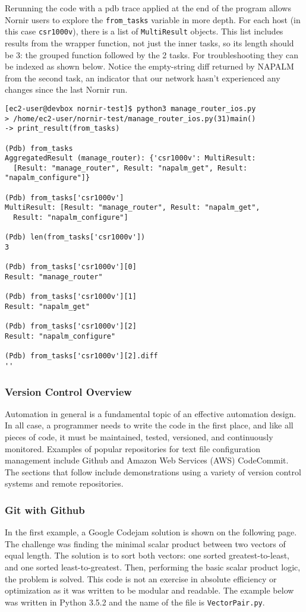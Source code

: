 Rerunning the code with a pdb trace applied at the end of the program allows
Nornir users to explore the \verb|from_tasks| variable in more depth. For each
host (in this case \verb|csr1000v|), there is a list of \verb|MultiResult| objects.
This list includes results from the wrapper function, not just the inner tasks, so
its length should be 3: the grouped function followed by the 2 tasks. For
troubleshooting they can be indexed as shown below. Notice the empty-string
diff returned by NAPALM from the second task, an indicator that our network
hasn't experienced any changes since the last Nornir run.

\begin{verbatim}
[ec2-user@devbox nornir-test]$ python3 manage_router_ios.py
> /home/ec2-user/nornir-test/manage_router_ios.py(31)main()
-> print_result(from_tasks)

(Pdb) from_tasks
AggregatedResult (manage_router): {'csr1000v': MultiResult:
  [Result: "manage_router", Result: "napalm_get", Result: "napalm_configure"]}

(Pdb) from_tasks['csr1000v']
MultiResult: [Result: "manage_router", Result: "napalm_get",
  Result: "napalm_configure"]

(Pdb) len(from_tasks['csr1000v'])
3

(Pdb) from_tasks['csr1000v'][0]
Result: "manage_router"

(Pdb) from_tasks['csr1000v'][1]
Result: "napalm_get"

(Pdb) from_tasks['csr1000v'][2]
Result: "napalm_configure"

(Pdb) from_tasks['csr1000v'][2].diff
''
\end{verbatim}

\subsubsection{Version Control Overview}
Automation in general is a fundamental topic of an effective automation
design. In all case, a programmer needs to write the code in the first
place, and like all pieces of code, it must be maintained, tested, versioned,
and continuously monitored. Examples of popular repositories for text file
configuration management include Github and Amazon Web Services (AWS) CodeCommit.
The sections that follow include demonstrations using a variety of version
control systems and remote repositories.

\subsubsection{Git with Github}
In the first example, a Google Codejam solution is shown on the following
page. The challenge was finding the minimal scalar product between two vectors
of equal length. The solution is to sort both vectors: one sorted
greatest-to-least, and one sorted least-to-greatest. Then, performing the
basic scalar product logic, the problem is solved. This code is not an
exercise in absolute efficiency or optimization as it was written to be
modular and readable. The example below was written in Python 3.5.2 and
the name of the file is \verb|VectorPair.py|.

